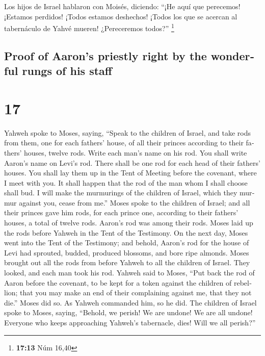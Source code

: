 \begin{paracol}{2}
 Los hijos de Israel hablaron con Moisés, diciendo: ``¡He
aquí que perecemos! ¡Estamos perdidos! ¡Todos estamos deshechos!
 ¡Todos los que se acercan al tabernáculo de Yahvé
mueren! ¿Pereceremos todos?'' \footnote{\textbf{17:13} Núm 16,40}

\switchcolumn
\begin{otherlanguage}{english}

\hypertarget{proof-of-aarons-priestly-right-by-the-wonderful-rungs-of-his-staff}{%
\subsection{Proof of Aaron's priestly right by the wonderful rungs of
his
staff}\label{proof-of-aarons-priestly-right-by-the-wonderful-rungs-of-his-staff}}

\hypertarget{section-33}{%
\section{17}\label{section-33}}

 Yahweh spoke to Moses, saying,  ``Speak to
the children of Israel, and take rods from them, one for each fathers'
house, of all their princes according to their fathers' houses, twelve
rods. Write each man's name on his rod.  You shall write
Aaron's name on Levi's rod. There shall be one rod for each head of
their fathers' houses.  You shall lay them up in the Tent
of Meeting before the covenant, where I meet with you.  It
shall happen that the rod of the man whom I shall choose shall bud. I
will make the murmurings of the children of Israel, which they murmur
against you, cease from me.''  Moses spoke to the children
of Israel; and all their princes gave him rods, for each prince one,
according to their fathers' houses, a total of twelve rods. Aaron's rod
was among their rods.  Moses laid up the rods before
Yahweh in the Tent of the Testimony.  On the next day,
Moses went into the Tent of the Testimony; and behold, Aaron's rod for
the house of Levi had sprouted, budded, produced blossoms, and bore ripe
almonds.  Moses brought out all the rods from before
Yahweh to all the children of Israel. They looked, and each man took his
rod.  Yahweh said to Moses, ``Put back the rod of Aaron
before the covenant, to be kept for a token against the children of
rebellion; that you may make an end of their complaining against me,
that they not die.''  Moses did so. As Yahweh commanded
him, so he did.  The children of Israel spoke to Moses,
saying, ``Behold, we perish! We are undone! We are all undone!
 Everyone who keeps approaching Yahweh's tabernacle,
dies! Will we all perish?''


\end{otherlanguage}
\end{paracol}
